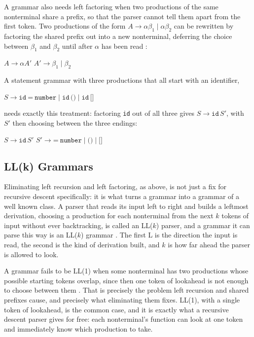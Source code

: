 A grammar also needs left factoring when two productions of the same
nonterminal share a prefix, so that the parser cannot tell them apart from
the first token. Two productions of the form $A \to \alpha\beta_1 \mid
\alpha\beta_2$ can be rewritten by factoring the shared prefix out into a
new nonterminal, deferring the choice between $\beta_1$ and $\beta_2$ until
after $\alpha$ has been read \cite{aho2006compilers}:
\begin{center}
$A \to \alpha A'$ \qquad $A' \to \beta_1 \mid \beta_2$
\end{center}
A statement grammar with three productions that all start with an
identifier,
\begin{center}
$S \to \texttt{id}\ \texttt{=}\ \texttt{number} \mid \texttt{id}\,\texttt{(}\texttt{)}
\mid \texttt{id}\,\texttt{[}\texttt{]}$
\end{center}
needs exactly this treatment: factoring \texttt{id} out of all three gives
$S \to \texttt{id}\,S'$, with $S'$ then choosing between the three endings:
\begin{center}
$S \to \texttt{id}\,S'$ \qquad
$S' \to \texttt{=}\ \texttt{number} \mid \texttt{(}\texttt{)} \mid \texttt{[}\texttt{]}$
\end{center}

\subsection{LL(k) Grammars}

Eliminating left recursion and left factoring, as above, is not just a fix
for recursive descent specifically: it is what turns a grammar into a
grammar of a well known class. A parser that reads its input left to right
and builds a leftmost derivation, choosing a production for each
nonterminal from the next $k$ tokens of input without ever backtracking, is
called an LL($k$) parser, and a grammar it can parse this way is an LL($k$)
grammar \cite{aho2006compilers}. The first L is the direction the input is
read, the second is the kind of derivation built, and $k$ is how far ahead
the parser is allowed to look.

A grammar fails to be LL(1) when some nonterminal has two productions whose
possible starting tokens overlap, since then one token of lookahead is not
enough to choose between them \cite{aho2006compilers}. That is precisely
the problem left recursion and shared prefixes cause, and precisely what
eliminating them fixes. LL(1), with a single token of lookahead, is the
common case, and it is exactly what a recursive descent parser gives for
free: each nonterminal's function can look at one token and immediately
know which production to take.

